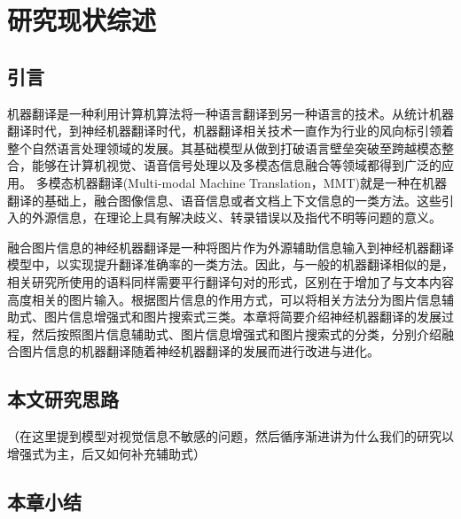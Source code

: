 \chapter{研究现状综述}\label{chap:relatedwork}

\section{引言}
机器翻译是一种利用计算机算法将一种语言翻译到另一种语言的技术。从统计机器翻译时代，到神经机器翻译时代，机器翻译相关技术一直作为行业的风向标引领着整个自然语言处理领域的发展。其基础模型从做到打破语言壁垒突破至跨越模态整合，能够在计算机视觉、语音信号处理以及多模态信息融合等领域都得到广泛的应用。
多模态机器翻译(Multi-modal Machine Translation，MMT)就是一种在机器翻译的基础上，融合图像信息、语音信息或者文档上下文信息的一类方法。这些引入的外源信息，在理论上具有解决歧义、转录错误以及指代不明等问题的意义。

融合图片信息的神经机器翻译是一种将图片作为外源辅助信息输入到神经机器翻译模型中，以实现提升翻译准确率的一类方法。因此，与一般的机器翻译相似的是，相关研究所使用的语料同样需要平行翻译句对的形式，区别在于增加了与文本内容高度相关的图片输入。根据图片信息的作用方式，可以将相关方法分为图片信息辅助式、图片信息增强式和图片搜索式三类。本章将简要介绍神经机器翻译的发展过程，然后按照图片信息辅助式、图片信息增强式和图片搜索式的分类，分别介绍融合图片信息的机器翻译随着神经机器翻译的发展而进行改进与进化。








\section{本文研究思路}
（在这里提到模型对视觉信息不敏感的问题，然后循序渐进讲为什么我们的研究以增强式为主，后又如何补充辅助式）

\section{本章小结}

